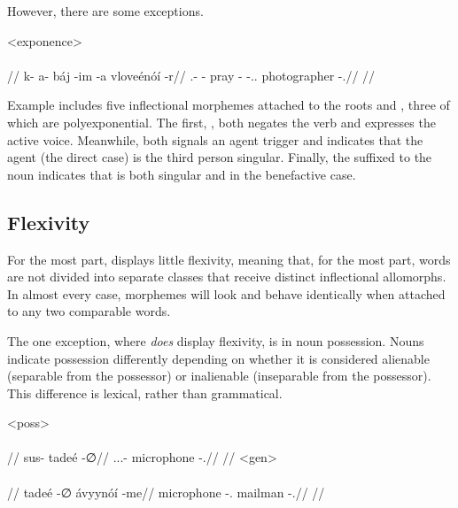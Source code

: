 However, there are some exceptions.

\ex<exponence>
	\begingl
		\glpreamble{}\\
		\\
		//
		\gla k- a- báj -im -a vloveénóí -r//
		\glb \Act.\Neg- \Ind- pray -\Prg{} -\At.\Dir.\Tps{} photographer -\Ben.\Sg//
		\glft {}//
	\endgl
\xe

Example  includes five inflectional morphemes attached to the roots  and , three of which are polyexponential. The first, , both negates the verb and expresses the active voice. Meanwhile,  both signals an agent trigger and indicates that the agent (the direct case) is the third person singular. Finally, the  suffixed to the noun indicates that  is both singular and in the benefactive case.


\subsection{Flexivity}
\label{sec:flexivity}

For the most part, \lang{} displays little flexivity, meaning that, for the most part, words are not divided into separate classes that receive distinct inflectional allomorphs. In almost every case, morphemes will look and behave identically when attached to any two comparable words.

The one exception, where \lang{} \emph{does} display flexivity, is in noun possession\autocite{wals-59}. Nouns indicate possession differently depending on whether it is considered alienable (separable from the possessor) or inalienable (inseparable from the possessor). This difference is lexical, rather than grammatical.

	\a<poss>\begingl
		\glpreamble{}\\
		\\
		//
		\gla sus- tadeé -∅//
		\glb \Tps.\Prox.\Poss.\Ali- microphone -\Dir.\Sg//
		\glft {}//
	\endgl
	\a<gen>\begingl
		\glpreamble{}\\
		\\
		//
		\gla tadeé -∅ ávyynóí -me//
		\glb microphone -\Dir.\Sg{} mailman -\Gen.\Sg//
		\glft {}//
	\endgl
\xe

